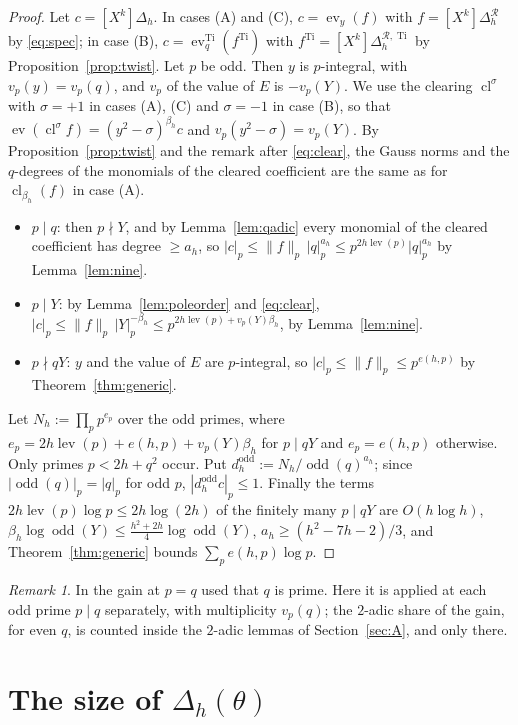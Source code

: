 \documentclass[11pt]{amsart}
\theoremstyle{definition}
\theoremstyle{remark}
\newtheorem{remark}[theorem]{Remark}
\numberwithin{equation}{section}
\newcommand{\cR}{\mathcal{R}}
\newcommand{\lev}{\operatorname{lev}}
\newcommand{\Ti}{\operatorname{Ti}}
\newcommand{\odd}{\operatorname{odd}}
\newcommand{\cl}{\operatorname{cl}}
\newcommand{\ev}{\operatorname{ev}}
\begin{document}
\begin{proof}
Let $c=[X^k]\Delta_h$. In cases (A) and (C), $c=\ev_y(f)$ with $f=[X^k]\Delta^{\cR}_h$ by \eqref{eq:spec}; in case (B),
$c=\ev^{\Ti}_q(f^{\Ti})$ with $f^{\Ti}=[X^k]\Delta^{\cR,\Ti}_h$ by Proposition~\ref{prop:twist}. Let $p$ be odd. Then $y$
is $p$-integral, with $v_p(y)=v_p(q)$, and $v_p$ of the value of $E$ is $-v_p(Y)$. We use the clearing $\cl^\sigma$ with
$\sigma=+1$ in cases (A), (C) and $\sigma=-1$ in case (B), so that $\ev(\cl^\sigma f)=(y^2-\sigma)^{\beta_h}c$ and
$v_p(y^2-\sigma)=v_p(Y)$. By Proposition~\ref{prop:twist} and the remark after \eqref{eq:clear}, the Gauss norms and the
$q$-degrees of the monomials of the cleared coefficient are the same as for $\cl_{\beta_h}(f)$ in case (A).
\begin{itemize}
\item $p\mid q$: then $p\nmid Y$, and by Lemma~\ref{lem:qadic} every monomial of the cleared coefficient has degree
  $\ge a_h$, so $|c|_p\le\|f\|_p\,|q|_p^{a_h}\le p^{2h\lev(p)}|q|_p^{a_h}$ by Lemma~\ref{lem:nine}.
\item $p\mid Y$: by Lemma~\ref{lem:poleorder} and \eqref{eq:clear},
  $|c|_p\le\|f\|_p\,|Y|_p^{-\beta_h}\le p^{2h\lev(p)+v_p(Y)\beta_h}$, by Lemma~\ref{lem:nine}.
\item $p\nmid qY$: $y$ and the value of $E$ are $p$-integral, so $|c|_p\le\|f\|_p\le p^{e(h,p)}$ by
  Theorem~\ref{thm:generic}.
\end{itemize}
Let $N_h:=\prod_pp^{e_p}$ over the odd primes, where $e_p=2h\lev(p)+e(h,p)+v_p(Y)\beta_h$ for $p\mid qY$ and $e_p=e(h,p)$
otherwise. Only primes $p<2h+q^2$ occur. Put $d^{\odd}_h:=N_h/\odd(q)^{a_h}$; since $|\odd(q)|_p=|q|_p$ for odd $p$,
$|d^{\odd}_hc|_p\le1$. Finally the terms $2h\lev(p)\log p\le2h\log(2h)$ of the finitely many $p\mid qY$ are $O(h\log h)$,
$\beta_h\log\odd(Y)\le\frac{h^2+2h}4\log\odd(Y)$, $a_h\ge(h^2-7h-2)/3$, and Theorem~\ref{thm:generic} bounds
$\sum_pe(h,p)\log p$.
\end{proof}

\begin{remark}
In \cite{Chi2Paper} the gain at $p=q$ used that $q$ is prime. Here it is applied at each odd prime $p\mid q$ separately,
with multiplicity $v_p(q)$; the $2$-adic share of the gain, for even $q$, is counted inside the $2$-adic lemmas of
Section~\ref{sec:A}, and only there.
\end{remark}

\section{\texorpdfstring{The size of $\Delta_h(\theta)$}{The size of Delta_h(theta)}}\label{sec:analytic}
\end{document}
